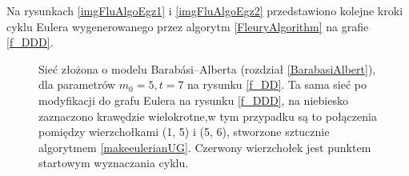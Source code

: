 \documentclass[a4paper, 12pt, twoside, openright]{article}
\begin{document}
Na rysunkach \ref{imgFluAlgoEgz1} i \ref{imgFluAlgoEgz2} przedstawiono kolejne kroki  cyklu Eulera wygenerowanego przez algorytm \ref{FleuryAlgorithm} na grafie \ref{f_DDD}.
	\begin{figure}[!p]
			\centering
				\quad
		
		\caption[]{Sieć złożona o modelu Barabási–Alberta (rozdział \ref{BarabasiAlbert}), dla parametrów $m_0=5, t=7$ na rysunku \ref{f_DD}. Ta sama sieć po modyfikacji do grafu Eulera na rysunku \ref{f_DDD}, na niebiesko zaznaczono krawędzie wielokrotne,w tym przypadku są to połączenia pomiędzy wierzchołkami (1, 5) i (5, 6), stworzone sztucznie algorytmem \ref{makeeulerianUG}. Czerwony wierzchołek jest punktem startowym wyznaczania cyklu.}
		\label{f_graph}
	\end{figure}	
	\captionsetup{justification=centering}
	
\end{document}
